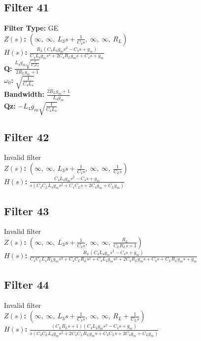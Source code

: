 \documentclass{article}
\begin{document}
\subsection*{Filter 41}
\textbf{Filter Type:} GE \\ 
\textbf{$Z(s)$:} $\left( \infty, \  \infty, \  L_{3} s + \frac{1}{C_{3} s}, \  \infty, \  \infty, \  R_{L}\right)$ \\ 
\textbf{$H(s)$:} $\frac{R_{L} \left(C_{4} L_{4} g_{m} s^{2} - C_{4} s + g_{m}\right)}{C_{4} L_{4} g_{m} s^{2} + 2 C_{4} R_{L} g_{m} s + C_{4} s + g_{m}}$ \\ 
\textbf{Q:} $\frac{L_{4} g_{m} \sqrt{\frac{1}{C_{4} L_{4}}}}{2 R_{L} g_{m} + 1}$ \\ 
\textbf{$\omega_0$:} $\sqrt{\frac{1}{C_{4} L_{4}}}$ \\ 
\textbf{Bandwidth:} $\frac{2 R_{L} g_{m} + 1}{L_{4} g_{m}}$ \\ 
\textbf{Qz:} $- L_{4} g_{m} \sqrt{\frac{1}{C_{4} L_{4}}}$ \\ 
\subsection*{Filter 42}
Invalid filter \\ 
\textbf{$Z(s)$:} $\left( \infty, \  \infty, \  L_{3} s + \frac{1}{C_{3} s}, \  \infty, \  \infty, \  \frac{1}{C_{L} s}\right)$ \\ 
\textbf{$H(s)$:} $\frac{C_{4} L_{4} g_{m} s^{2} - C_{4} s + g_{m}}{s \left(C_{4} C_{L} L_{4} g_{m} s^{2} + C_{4} C_{L} s + 2 C_{4} g_{m} + C_{L} g_{m}\right)}$ \\ 
\subsection*{Filter 43}
Invalid filter \\ 
\textbf{$Z(s)$:} $\left( \infty, \  \infty, \  L_{3} s + \frac{1}{C_{3} s}, \  \infty, \  \infty, \  \frac{R_{L}}{C_{L} R_{L} s + 1}\right)$ \\ 
\textbf{$H(s)$:} $\frac{R_{L} \left(C_{4} L_{4} g_{m} s^{2} - C_{4} s + g_{m}\right)}{C_{4} C_{L} L_{4} R_{L} g_{m} s^{3} + C_{4} C_{L} R_{L} s^{2} + C_{4} L_{4} g_{m} s^{2} + 2 C_{4} R_{L} g_{m} s + C_{4} s + C_{L} R_{L} g_{m} s + g_{m}}$ \\ 
\subsection*{Filter 44}
Invalid filter \\ 
\textbf{$Z(s)$:} $\left( \infty, \  \infty, \  L_{3} s + \frac{1}{C_{3} s}, \  \infty, \  \infty, \  R_{L} + \frac{1}{C_{L} s}\right)$ \\ 
\textbf{$H(s)$:} $\frac{\left(C_{L} R_{L} s + 1\right) \left(C_{4} L_{4} g_{m} s^{2} - C_{4} s + g_{m}\right)}{s \left(C_{4} C_{L} L_{4} g_{m} s^{2} + 2 C_{4} C_{L} R_{L} g_{m} s + C_{4} C_{L} s + 2 C_{4} g_{m} + C_{L} g_{m}\right)}$ \\ 
\end{document}
